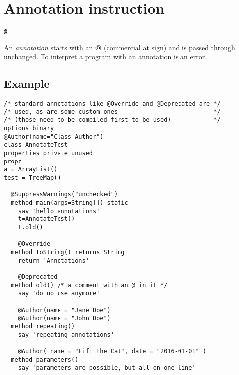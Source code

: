 \chapter{Annotation instruction}\label{refparse}
\begin{shaded}
\begin{alltt}
\textbf{@}
\end{alltt}
\end{shaded}
An \emph{annotation} starts with an \textbf{@} (commercial at sign)
and is passed through unchanged. To interpret a program with an annotation is an error.
\section{Example}
\begin{lstlisting}
/* standard annotations like @Override and @Deprecated are */
/* used, as are some custom ones                           */
/* (those need to be compiled first to be used)            */
options binary
@Author(name="Class Author")
class AnnotateTest
properties private unused
propz
a = ArrayList()
test = TreeMap()

  @SuppressWarnings("unchecked")
  method main(args=String[]) static
    say 'hello annotations'
    t=AnnotateTest()
    t.old()

    @Override
  method toString() returns String
    return 'Annotations'

    @Deprecated
  method old() /* a comment with an @ in it */
    say 'do no use anymore'

    @Author(name = "Jane Doe")
    @Author(name = "John Doe")
  method repeating()
    say 'repeating annotations'

    @Author( name = "Fifi the Cat", date = "2016-01-01" )
  method parameters()
    say 'parameters are possible, but all on one line'
\end{lstlisting}
